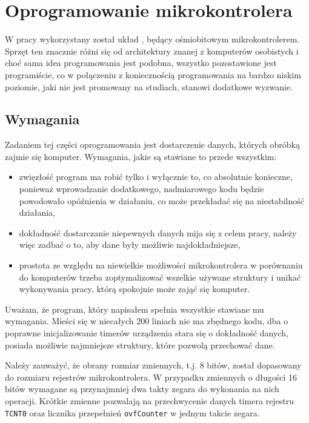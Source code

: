 \label{ch:implementation}

\section{Oprogramowanie mikrokontrolera}
W pracy wykorzystany został układ , będący ośmiobitowym mikrokontrolerem. Sprzęt ten znacznie różni się od architektury znanej z komputerów osobistych  i choć sama idea programowania jest podobna, wszystko pozostawione jest programiście, co w połączeniu z koniecznością programowania na bardzo niskim poziomie, jaki nie jest promowany na studiach, stanowi dodatkowe wyzwanie.

\subsection{Wymagania}
Zadaniem tej części oprogramowania jest dostarczenie danych, których obróbką zajmie się komputer. Wymagania, jakie są stawiane to przede wszystkim:
\begin{itemize}
 \item zwięzłość \ppauza program ma robić tylko i wyłącznie to, co absolutnie konieczne, ponieważ wprowadzanie dodatkowego, nadmiarowego kodu będzie powodowało opóźnienia w działaniu, co może przekładać się na
    niestabilność działania,
 \item dokładność \ppauza dostarczanie niepewnych danych mija się z celem pracy, należy więc zadbać o to, aby dane były możliwie najdokładniejsze,
 \item prostota \ppauza ze względu na niewielkie możliwości mikrokontrolera \ppauza w porównaniu do komputerów \ppauza trzeba zoptymalizować wszelkie używane struktury i unikać wykonywania pracy, którą spokojnie może zająć się komputer.
\end{itemize}

Uważam, że program, który napisałem spełnia wszystkie stawiane mu wymagania. Mieści się w niecałych 200 liniach \ppauza nie ma zbędnego kodu, dba o poprawne inicjalizowanie timerów urządzenia \ppauza stara się o dokładność danych, posiada możliwie najmniejsze struktury, które pozwolą przechować dane.

Należy zauważyć, że obrany rozmiar zmiennych, t.j. 8 bitów, został dopasowany do rozmiaru rejestrów mikrokontrolera. W przypadku zmiennych o długości 16 bitów wymagane są przynajmniej dwa takty zegara do wykonania na nich operacji. Krótkie zmienne pozwalają na przechwycenie danych timera \ppauza rejestru \texttt{TCNT0} oraz licznika przepełnień \texttt{ovfCounter} \ppauza w jednym takcie zegara.


